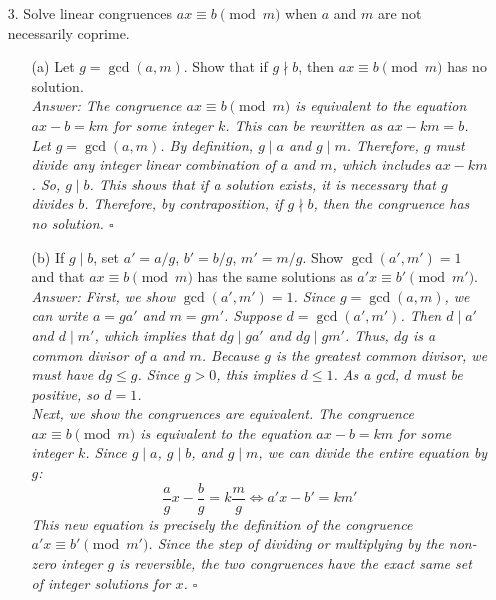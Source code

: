 \documentclass{article}
\begin{document}
\begin{itemize}
    \medskip

    \item[3.] Solve linear congruences $ax\equiv b \pmod m$ when $a$ and $m$ are not necessarily coprime.
    \begin{itemize}
        \item[(a)] Let $g=\gcd(a,m)$. Show that if $g\nmid b$, then $ax\equiv b \pmod m$ has no solution.
        \medskip\\
        \textit{Answer: The congruence $ax\equiv b\pmod m$ is equivalent to the equation $ax-b = km$ for some integer $k$. This can be rewritten as $ax - km = b$.
        Let $g=\gcd(a,m)$. By definition, $g \mid a$ and $g \mid m$. Therefore, $g$ must divide any integer linear combination of $a$ and $m$, which includes $ax-km$.
        So, $g \mid b$. This shows that if a solution exists, it is necessary that $g$ divides $b$.
        Therefore, by contraposition, if $g\nmid b$, then the congruence has no solution. \hfill$\square$}

        \medskip

        \item[(b)] If $g\mid b$, set $a'=a/g$, $b'=b/g$, $m'=m/g$. Show $\gcd(a',m')=1$ and that $ax\equiv b\pmod m$ has the same solutions as $a'x\equiv b'\pmod{m'}$.
        \medskip\\
        \textit{Answer:
        First, we show $\gcd(a',m')=1$. Since $g=\gcd(a,m)$, we can write $a=ga'$ and $m=gm'$. Suppose $d=\gcd(a',m')$. Then $d \mid a'$ and $d \mid m'$, which implies that $dg \mid ga'$ and $dg \mid gm'$. Thus, $dg$ is a common divisor of $a$ and $m$. Because $g$ is the \emph{greatest} common divisor, we must have $dg \le g$. Since $g>0$, this implies $d\le 1$. As a gcd, $d$ must be positive, so $d=1$.
        \medskip\\
        Next, we show the congruences are equivalent.
        The congruence $ax \equiv b \pmod m$ is equivalent to the equation $ax-b = km$ for some integer $k$.
        Since $g \mid a$, $g \mid b$, and $g \mid m$, we can divide the entire equation by $g$:
        $$ \frac{a}{g}x - \frac{b}{g} = k \frac{m}{g} \iff a'x - b' = k m' $$
        This new equation is precisely the definition of the congruence $a'x \equiv b' \pmod{m'}$. Since the step of dividing or multiplying by the non-zero integer $g$ is reversible, the two congruences have the exact same set of integer solutions for $x$. \hfill$\square$}

        \medskip


\end{itemize}
\end{itemize}
\end{document}
